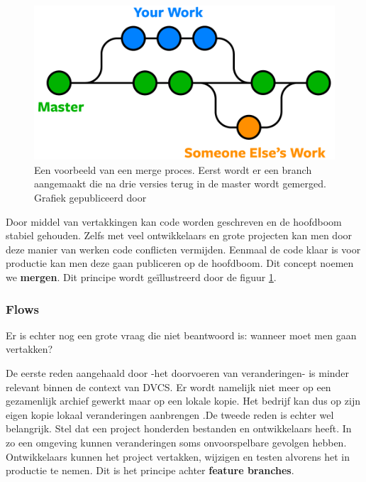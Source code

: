 \begin{figure}
\begin{center}
  	\includegraphics[scale=0.2]{git-branches-merge.png}
\end{center}
\caption[Voorbeeld merge proces.]{Een voorbeeld van een merge proces. Eerst wordt er een branch aangemaakt die na drie versies terug in de master wordt gemerged. Grafiek gepubliceerd door \textcite{NobleDesktop2018}}\label{fig_merge}
\end{figure}

Door middel van vertakkingen kan code worden geschreven en de hoofdboom stabiel gehouden. Zelfs met veel ontwikkelaars en grote projecten kan men door deze manier van werken code conflicten vermijden. Eenmaal de code klaar is voor productie kan men deze gaan publiceren op de hoofdboom. Dit concept noemen we \textbf{mergen}. Dit principe wordt geïllustreerd door de figuur \ref{fig_merge}.


\subsubsection{Flows}
Er is echter nog een grote vraag die niet beantwoord is: wanneer moet men gaan vertakken?

De eerste reden aangehaald door \textcite{Tichy85rcs} -het doorvoeren van veranderingen- is minder relevant binnen de context van DVCS. Er wordt namelijk niet meer op een gezamenlijk archief gewerkt maar op een lokale kopie. Het bedrijf kan dus op zijn eigen kopie lokaal veranderingen aanbrengen .De tweede reden is echter wel belangrijk. Stel dat een project honderden bestanden en ontwikkelaars heeft. In zo een omgeving kunnen veranderingen soms onvoorspelbare gevolgen hebben. Ontwikkelaars kunnen het project vertakken, wijzigen en testen alvorens het in productie te nemen. Dit is het principe achter \textbf{feature branches}.\\

